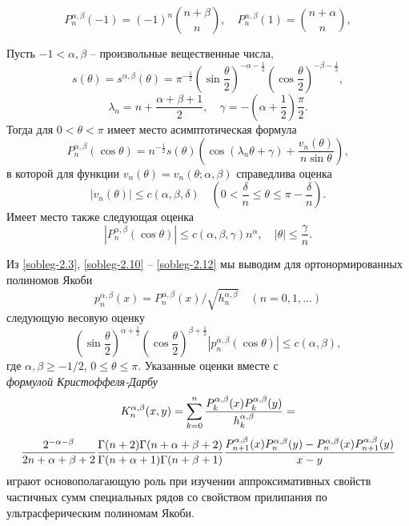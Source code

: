 \begin{equation}\label{sobleg-2.9}
P_n^{\alpha,\beta}(-1)=(-1)^n {n+\beta\choose n},\quad P_n^{\alpha,\beta}(1)= {n+\alpha\choose n},
\end{equation}


Пусть $-1<\alpha, \beta$ -- произвольные вещественные числа,
$$
s(\theta)=s^{\alpha,\beta}(\theta)=\pi^{-\frac12}
\left(\sin\frac{\theta}{2}\right)^{-\alpha-\frac12}
\left(\cos\frac{\theta}{2}\right)^{-\beta-\frac12},
$$
$$
\lambda_n=n+\frac{\alpha+\beta+1}{2}, \quad\gamma=-
\left(\alpha+\frac{1}{2}\right)\frac{\pi}{2}.
$$
Тогда для $0<\theta<\pi$ имеет место асимптотическая формула
\begin{equation}\label{sobleg-2.10}
P_n^{\alpha,\beta}(\cos\theta)=n^{-\frac12}s(\theta)
\left(\cos(\lambda_n\theta+\gamma)+
\frac{v_n(\theta)}{n\sin\theta}\right),
\end{equation}
в которой для функции $v_n(\theta)=v_n(\theta;\alpha,\beta)$
справедлива оценка
\begin{equation}\label{sobleg-2.11}
|v_n(\theta)|\le c(\alpha,\beta,\delta)\quad
 \left(0<\frac{\delta}{n}\le\theta\le\pi-\frac{\delta}{n}\right).
\end{equation}
Имеет место также следующая оценка
\begin{equation}\label{sobleg-2.12}
|P_n^{\alpha,\beta}(\cos\theta)|\le c(\alpha,\beta,\gamma)n^\alpha, \quad |\theta|\le \frac{\gamma}{n}.
\end{equation}

Из \eqref{sobleg-2.3}, \eqref{sobleg-2.10} -- \eqref{sobleg-2.12} мы выводим для ортонормированных   полиномов Якоби
\begin{equation}\label{sobleg-2.13}
p_n^{\alpha,\beta}(x)=P_n^{\alpha,\beta}(x)/\sqrt{h_n^{\alpha,\beta}}\quad(n=0,1,\ldots)
\end{equation}
 следующую весовую оценку
\begin{equation}\label{sobleg-2.14}
\left(\sin\frac{\theta}{2}\right)^{\alpha+\frac12}
\left(\cos\frac{\theta}{2}\right)^{\beta+\frac12}
|p_n^{\alpha,\beta}(\cos\theta)|\le c(\alpha,\beta),
\end{equation}
где $\alpha,\beta\ge-1/2$, $0\le\theta\le\pi$. Указанные оценки вместе с \\
\textit{ формулой Кристоффеля-Дарбу }
$$
 K_n^{\alpha,\beta}(x,y)=
\sum_{k=0}^n{P_k^{\alpha,\beta}(x)P_k^{\alpha,\beta}(y)\over
h_k^{\alpha,\beta}}=
 $$
\begin{equation}\label{sobleg-2.15}
 {2^{-\alpha-\beta}\over
2n+\alpha+\beta+2} {\Gamma(n+2)\Gamma(n+\alpha+\beta+2)\over
\Gamma(n+\alpha+1)\Gamma(n+\beta+1)}
 {P_{n+1}^{\alpha,\beta}(x)P_n^{\alpha,\beta}(y)-
P_n^{\alpha,\beta}(x)P_{n+1}^{\alpha,\beta}(y)\over x-y}
\end{equation}
играют основополагающую роль при изучении аппроксимативных свойств частичных сумм специальных рядов со свойством прилипания по ультрасферическим полиномам Якоби.

